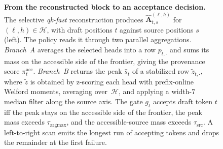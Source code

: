 \begin{figure}[t]
{\begin{tikzpicture}
\end{tikzpicture}
}%
\caption{\textbf{From the reconstructed block to an acceptance decision.}
The selective \emph{qk-fast} reconstruction produces
$\widehat{\mathbf{A}}^{(\ell,h)}_{t,s}$ for $(\ell,h)\in\mathcal{H}$, with draft
positions $t$ against source positions $s$ (left). The policy reads it through
two parallel aggregations. \emph{Branch~A} averages the selected heads into a
row $p_{t,\cdot}$ and sums its mass on the accessible side of the frontier,
giving the provenance score $\pi^{\mathrm{acc}}_t$. \emph{Branch~B} returns
the peak $\hat s_t$ of a stabilized row $\tilde z_{t,\cdot}$, where $\tilde
z$ is obtained by z-scoring each head with prefix-online Welford moments,
averaging over~$\mathcal{H}$, and applying a width-$7$ median filter along
the source axis. The gate $g_t$ accepts draft token $t$ iff the peak stays on
the accessible side of the frontier, the peak mass exceeds
$\tau_{\mathrm{argmax}}$, and the accessible-source mass exceeds
$\tau_{\mathrm{src}}$. A left-to-right scan emits the longest run of accepting
tokens and drops the remainder at the first failure.}
\label{fig:policy-pipeline}
\end{figure}
